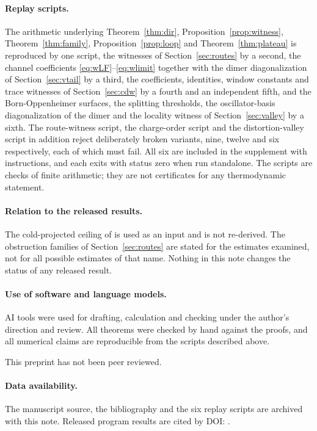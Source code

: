 \documentclass[11pt]{article}
\theoremstyle{definition}
\theoremstyle{remark}
\begin{document}
\paragraph{Replay scripts.} The arithmetic underlying
Theorem~\ref{thm:dir}, Proposition~\ref{prop:witness},
Theorem~\ref{thm:family}, Proposition~\ref{prop:loop} and
Theorem~\ref{thm:plateau} is reproduced by one script, the witnesses of
Section~\ref{sec:routes} by a second, the channel coefficients
\eqref{eq:wLF}--\eqref{eq:wlimit} together with the dimer diagonalization of
Section~\ref{sec:vtail} by a third, the coefficients, identities, window
constants and trace witnesses of Section~\ref{sec:cdw} by a fourth and an
independent fifth, and the Born-Oppenheimer surfaces, the splitting thresholds,
the oscillator-basis diagonalization of the dimer and the locality witness of
Section~\ref{sec:valley} by a sixth. The route-witness script, the charge-order
script and the distortion-valley script in addition reject deliberately broken
variants, nine, twelve and six respectively, each of which must fail. All six are
included in the supplement with instructions, and each exits with status zero
when run standalone. The scripts are checks of finite arithmetic; they are not
certificates for any thermodynamic statement.

\paragraph{Relation to the released results.} The cold-projected ceiling of
\cite{largeu} is used as an input and is not re-derived. The obstruction families
of Section~\ref{sec:routes} are stated for the estimates examined, not for all
possible estimates of that name. Nothing in this note changes the status of any
released result.

\paragraph{Use of software and language models.} AI tools were used for drafting,
calculation and checking under the author's direction and review. All theorems
were checked by hand against the proofs, and all numerical claims are reproducible
from the scripts described above.

This preprint has not been peer reviewed.

\paragraph{Data availability.} The manuscript source, the bibliography and the
six replay scripts are archived with this note. Released program results are
cited by DOI: \cite{largeu,strong,barriers2,barriers1,linear5}.



\end{document}

